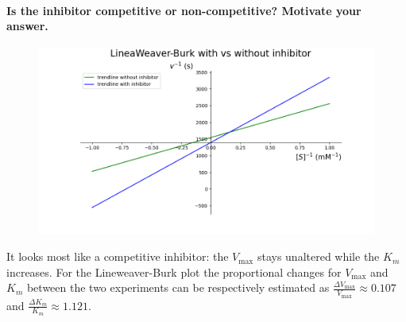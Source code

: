 \documentclass[a4paper,12pt]{article}
\begin{document}
\paragraph{Is the inhibitor competitive or non-competitive? Motivate your answer.}

\begin{figure}[htb]
    \includegraphics[scale=0.4]{fig3_6.png}
    \centering
\end{figure}

It looks most like a competitive inhibitor: the $V_{\text{max}}$ stays unaltered while the $K_m$ increases. For the Lineweaver-Burk 
plot the proportional changes for $V_{\text{max}}$ and $K_m$ between the two experiments can be respectively estimated as $\frac{\Delta V_{\text{max}}}{V_{\text{max}}} \approx 0.107$ 
and $\frac{\Delta K_m}{K_m} \approx 1.121$.
\end{document}
